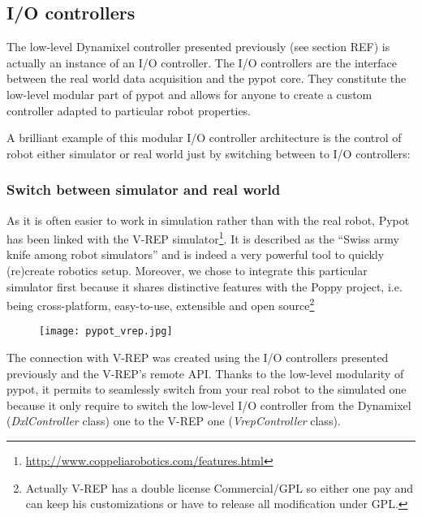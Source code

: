 \subsection{I/O controllers} %

The low-level Dynamixel controller presented previously (see section REF) is actually an instance of an I/O controller. The I/O controllers are the interface between the real world data acquisition and the pypot core. They constitute the low-level modular part of pypot and allows for anyone to create a custom controller adapted to particular robot properties.

A brilliant example of this modular I/O controller architecture is the control of robot either simulator or real world just by switching between to I/O controllers:

\subsubsection{Switch between simulator and real world} %

As it is often easier to work in simulation rather than with the real robot, Pypot has been linked with the V-REP simulator\footnote{\url{http://www.coppeliarobotics.com/features.html}}. It is described as the “Swiss army knife among robot simulators” and is indeed a very powerful tool to quickly (re)create robotics setup. Moreover, we chose to integrate this particular simulator first because it shares distinctive features with the Poppy project, i.e. being cross-platform, easy-to-use, extensible and open source\footnote{Actually V-REP has a double license Commercial/GPL so either one pay and can keep his customizations or have to release all modification under GPL.}

\begin{figure}[tb]
    \begin{center}
        \texttt{[image: pypot\_vrep.jpg]}
    \end{center}
    \caption{}
    \label{fig:pypot-vrep}
\end{figure}


The connection with V-REP was created using the I/O controllers presented previously and the V-REP’s remote API.
Thanks to the low-level modularity of pypot, it permits to seamlessly switch from your real robot to the simulated one because it only require to switch the low-level I/O controller from the Dynamixel (\emph{DxlController} class) one to the V-REP one (\emph{VrepController} class).

